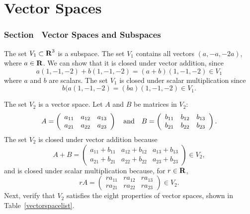 \chapter{Vector Spaces}

\subsection*{Section~\protect{\ref{S:5.1}} Vector Spaces and Subspaces}

The set $V_1 \subset \mbox{$\bf{R}$}^3$ is a subspace.
The set $V_1$ contains all vectors $(a,-a,-2a)$,
where $a \in \mbox{$\bf{R}$}$.  We can show that it is closed under
vector addition, since
\[
a(1,-1,-2) + b(1,-1,-2) = (a + b)(1,-1,-2) \in V_1
\]
where $a$ and $b$ are scalars.  The set $V_1$ is closed under scalar
multiplication since
\[
b(a(1,-1,-2) = (ba)(1,-1,-2) \in V_1.
\]

The set $V_2$ is a vector space.
Let $A$ and $B$ be matrices in $V_2$:
\[
A = \left(\begin{array}{rrr} a_{11} & a_{12} & a_{13} \\
a_{21} & a_{22} & a_{23} \end{array}\right) \quad\mbox{and}\quad
B = \left(\begin{array}{rrr} b_{11} & b_{12} & b_{13} \\
b_{21} & b_{22} & b_{23} \end{array}\right).
\]
The set $V_2$ is closed under vector addition because
\[
A + B
= \left(\begin{array}{rrr} a_{11} + b_{11} & a_{12} + b_{12} &
a_{13} + b_{13} \\ a_{21} + b_{21} & a_{22} + b_{22} &
a_{23} + b_{23} \end{array}\right) \in V_2,
\]
and is closed under scalar multiplication because, for $r \in \mbox{$\bf{R}$}$,
\[
rA = \left(\begin{array}{rrr} ra_{11} & ra_{12} & ra_{13} \\
ra_{21} & ra_{22} & ra_{23} \end{array}\right) \in V_2.
\]
Next, verify that $V_2$ satisfies the eight properties of vector
spaces, shown in Table~\ref{vectorspacelist}.

